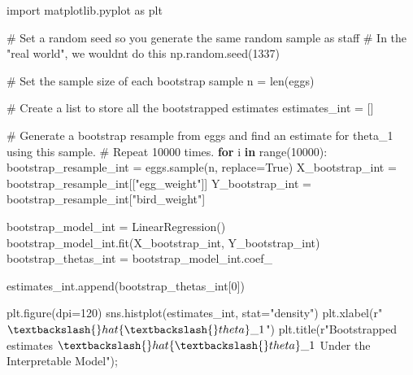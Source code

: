\documentclass[
  letterpaper,
  DIV=11,
  numbers=noendperiod]{scrreprt}
\newenvironment{Shaded}{\begin{snugshade}}{\end{snugshade}}
\newcommand{\BuiltInTok}[1]{\textcolor[rgb]{0.00,0.23,0.31}{#1}}
\newcommand{\CommentTok}[1]{\textcolor[rgb]{0.37,0.37,0.37}{#1}}
\newcommand{\ControlFlowTok}[1]{\textcolor[rgb]{0.00,0.23,0.31}{\textbf{#1}}}
\newcommand{\DecValTok}[1]{\textcolor[rgb]{0.68,0.00,0.00}{#1}}
\newcommand{\ImportTok}[1]{\textcolor[rgb]{0.00,0.46,0.62}{#1}}
\newcommand{\KeywordTok}[1]{\textcolor[rgb]{0.00,0.23,0.31}{\textbf{#1}}}
\newcommand{\NormalTok}[1]{\textcolor[rgb]{0.00,0.23,0.31}{#1}}
\newcommand{\OperatorTok}[1]{\textcolor[rgb]{0.37,0.37,0.37}{#1}}
\newcommand{\StringTok}[1]{\textcolor[rgb]{0.13,0.47,0.30}{#1}}
\newcommand{\VariableTok}[1]{\textcolor[rgb]{0.07,0.07,0.07}{#1}}
\newcommand{\VerbatimStringTok}[1]{\textcolor[rgb]{0.13,0.47,0.30}{#1}}
\begin{document}
\begin{Shaded}
\begin{Highlighting}[]
\ImportTok{import}\NormalTok{ matplotlib.pyplot }\ImportTok{as}\NormalTok{ plt}

\CommentTok{\# Set a random seed so you generate the same random sample as staff}
\CommentTok{\# In the "real world", we wouldn\textquotesingle{}t do this}
\NormalTok{np.random.seed(}\DecValTok{1337}\NormalTok{)}

\CommentTok{\# Set the sample size of each bootstrap sample}
\NormalTok{n }\OperatorTok{=} \BuiltInTok{len}\NormalTok{(eggs)}

\CommentTok{\# Create a list to store all the bootstrapped estimates}
\NormalTok{estimates\_int }\OperatorTok{=}\NormalTok{ []}

\CommentTok{\# Generate a bootstrap resample from \textasciigrave{}eggs\textasciigrave{} and find an estimate for theta\_1 using this sample. }
\CommentTok{\# Repeat 10000 times.}
\ControlFlowTok{for}\NormalTok{ i }\KeywordTok{in} \BuiltInTok{range}\NormalTok{(}\DecValTok{10000}\NormalTok{):}
\NormalTok{    bootstrap\_resample\_int }\OperatorTok{=}\NormalTok{ eggs.sample(n, replace}\OperatorTok{=}\VariableTok{True}\NormalTok{)}
\NormalTok{    X\_bootstrap\_int }\OperatorTok{=}\NormalTok{ bootstrap\_resample\_int[[}\StringTok{"egg\_weight"}\NormalTok{]]}
\NormalTok{    Y\_bootstrap\_int }\OperatorTok{=}\NormalTok{ bootstrap\_resample\_int[}\StringTok{"bird\_weight"}\NormalTok{]}
    
\NormalTok{    bootstrap\_model\_int }\OperatorTok{=}\NormalTok{ LinearRegression()}
\NormalTok{    bootstrap\_model\_int.fit(X\_bootstrap\_int, Y\_bootstrap\_int)}
\NormalTok{    bootstrap\_thetas\_int }\OperatorTok{=}\NormalTok{ bootstrap\_model\_int.coef\_}
    
\NormalTok{    estimates\_int.append(bootstrap\_thetas\_int[}\DecValTok{0}\NormalTok{])}

\NormalTok{plt.figure(dpi}\OperatorTok{=}\DecValTok{120}\NormalTok{)}
\NormalTok{sns.histplot(estimates\_int, stat}\OperatorTok{=}\StringTok{"density"}\NormalTok{)}
\NormalTok{plt.xlabel(}\VerbatimStringTok{r"$\textbackslash{}hat\{\textbackslash{}theta\}\_1$"}\NormalTok{)}
\NormalTok{plt.title(}\VerbatimStringTok{r"Bootstrapped estimates $\textbackslash{}hat\{\textbackslash{}theta\}\_1$ Under the Interpretable Model"}\NormalTok{)}\OperatorTok{;}
\end{Highlighting}
\end{Shaded}
\end{document}
